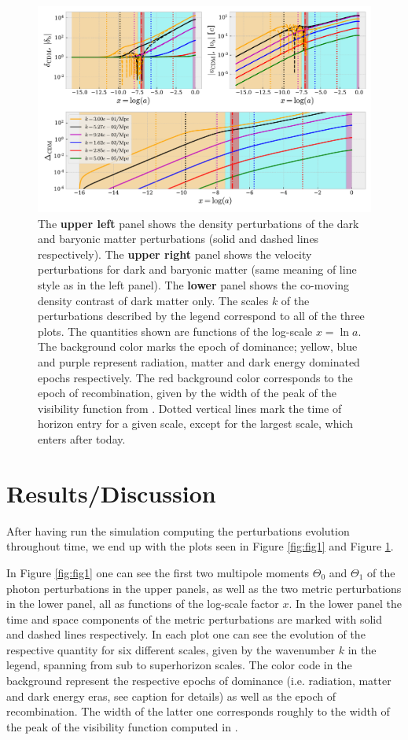 \documentclass[twocolumn]{aastex62}
\begin{document}
\begin{figure}
    \includegraphics[scale = 0.65]{Figures/fig2.pdf}
    \caption{The \textbf{upper left} panel shows the density perturbations of the dark and baryonic matter perturbations (solid and dashed lines respectively). The \textbf{upper right} panel shows the velocity perturbations for dark and baryonic matter (same meaning of line style as in the left panel). The \textbf{lower} panel shows the co-moving density contrast of dark matter only. The scales $k$ of the perturbations described by the legend correspond to all of the three plots. The quantities shown are functions of the log-scale $x = \ln a$.  The background color marks the epoch of dominance; yellow, blue and purple represent radiation, matter and dark energy dominated epochs respectively. The red background color corresponds to the epoch of recombination, given by the width of the peak of the visibility function from \cite{stutzer:2020b}. Dotted vertical lines mark the time of horizon entry for a given scale, except for the largest scale, which enters after today.}
    \label{fig:fig2}
\end{figure}

\section{Results/Discussion}\label{sec:Results}

After having run the simulation computing the perturbations evolution throughout time, we end up with the plots seen in Figure \ref{fig:fig1} and Figure \ref{fig:fig2}.

In Figure \ref{fig:fig1} one can see the first two multipole moments $\Theta_0$ and $\Theta_1$ of the photon perturbations in the upper panels, as well as the two metric perturbations in the lower panel, all as functions of the log-scale factor $x$. In the lower panel the time and space components of the metric perturbations are marked with solid and dashed lines respectively. In each plot one can see the evolution of the respective quantity for six different scales, given by the wavenumber $k$ in the legend, spanning from sub to superhorizon scales. The color code in the background represent the respective epochs of dominance (i.e. radiation, matter and dark energy eras, see caption for details) as well as the epoch of recombination. The width of the latter one corresponds roughly to the width of the peak of the visibility function computed in \cite{stutzer:2020b}. 
\end{document}
